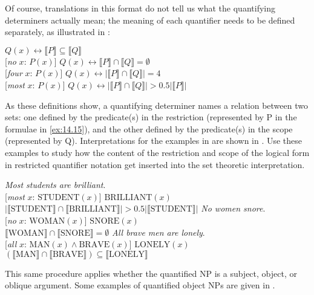Of course, translations in this format do not tell us what the quantifying determiners actually mean; the meaning of each quantifier needs to be defined separately, as illustrated in :


\ea \label{ex:14.15}
\ea {} $Q(x)  \leftrightarrow   \llbracket P\rrbracket  \subseteq \llbracket Q \rrbracket$ \\
\ex{} [\textit{no} $x$: $P(x)$] $Q(x)  \leftrightarrow   \llbracket P \rrbracket \cap \llbracket Q \rrbracket = \emptyset$ \\
\ex{} [\textit{four} $x$: $P(x)$] $Q(x) \leftrightarrow   | \llbracket P \rrbracket \cap \llbracket Q \rrbracket| =  4$\\
\ex{} [\textit{most} $x$: $P(x)$] $Q(x)  \leftrightarrow  | \llbracket P \rrbracket \cap \llbracket Q \rrbracket | >  0.5 |\llbracket P \rrbracket|$
     \z
\z


As these definitions show, a quantifying determiner names a relation between two sets: one defined by the predicate(s) in the restriction (represented by P in the formulae in \ref{ex:14.15}), and the other defined by the predicate(s) in the scope (represented by Q). Interpretations for the examples in  are shown in . Use these examples to study how the content of the restriction and scope of the logical form in restricted quantifier notation get inserted into the set theoretic interpretation.


\ea \label{ex:14.16}
\ea  \textit{Most students are brilliant}.\\
{}[\textit{most} $x$: $\text{STUDENT}(x)$] $\text{BRILLIANT}(x)$\\
$|\llbracket \text{STUDENT} \rrbracket \cap \llbracket \text{BRILLIANT} \rrbracket | > 0.5 | \llbracket \text{STUDENT} \rrbracket|$
\ex \textit{No women snore}.\\
{}[\textit{no} $x$: $\text{WOMAN}(x)$] $\text{SNORE}(x)$\\
$\llbracket \text{WOMAN} \rrbracket \cap \llbracket \text{SNORE} \rrbracket = \emptyset$
\ex   \textit{All brave men are lonely}.\\
{}[\textit{all} $x$: $\text{MAN}(x) \wedge \text{BRAVE}(x)$] $\text{LONELY}(x)$\\
$(\llbracket \text{MAN} \rrbracket \cap \llbracket \text{BRAVE} \rrbracket ) \subseteq \llbracket \text{LONELY} \rrbracket$ 
\z \z


This same procedure applies whether the quantified NP is a subject, object, or oblique argument. Some examples of quantified object NPs are given in .


